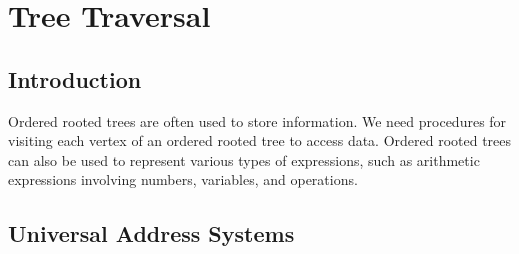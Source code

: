 \documentclass{article}
\begin{document}



\section{Tree Traversal}
\setcounter{figure}{0}

\subsection{Introduction}

Ordered rooted trees are often used to store information. We need procedures for visiting each vertex of an ordered rooted tree to access data. Ordered rooted trees can also be used to represent various types of expressions, such as arithmetic expressions involving numbers, variables, and operations.

\subsection{Universal Address Systems}
\end{document}
